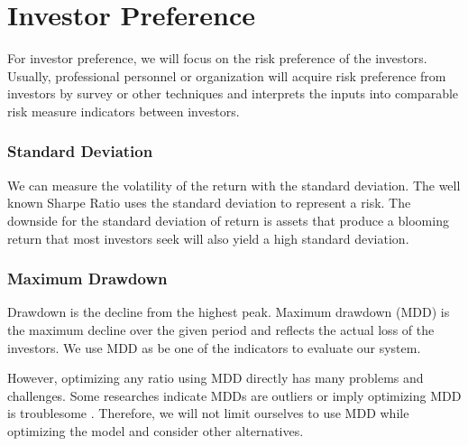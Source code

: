 \section{Investor Preference}
For investor preference, we will focus on the risk preference of the investors. Usually, professional personnel or organization will acquire risk preference from investors by survey or other techniques and interprets the inputs into comparable risk measure indicators between investors. 
\subsubsection{Standard Deviation}
We can measure the volatility of the return with the standard deviation. The well known Sharpe Ratio uses the standard deviation to represent a risk. The downside for the standard deviation of return is assets that produce a blooming return that most investors seek will also yield a high standard deviation.
\subsubsection{Maximum Drawdown}
Drawdown is the decline from the highest peak. Maximum drawdown (MDD) is the maximum decline over the given period and reflects the actual loss of the investors. We use MDD as be one of the indicators to evaluate our system. 
\par
However, optimizing any ratio using MDD directly has many problems and challenges. Some researches indicate MDDs are outliers \cite {johansen2002large, johansen1998stock} or imply optimizing MDD is troublesome \cite{moody1998performance}. Therefore, we will not limit ourselves to use MDD while optimizing the model and consider other alternatives. 